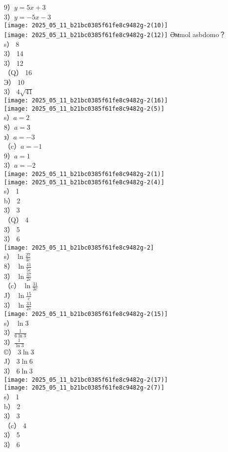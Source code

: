 \documentclass[10pt]{article}
\begin{document}
9）$y=5 x+3$\\
3）$y=-5 x-3$\\
\texttt{[image: 2025\_05\_11\_b21bc0385f61fe8c9482g-2(10)]}\\
\texttt{[image: 2025\_05\_11\_b21bc0385f61fe8c9482g-2(12)]} Әмmol asbdomo？\\
s） 8\\
3） 14\\
3） 12\\
（Q） 16\\
Э） 10\\
3） $4 \sqrt{41}$\\
\texttt{[image: 2025\_05\_11\_b21bc0385f61fe8c9482g-2(16)]}\\
\texttt{[image: 2025\_05\_11\_b21bc0385f61fe8c9482g-2(5)]}\\
s）$a=2$\\
8）$a=3$\\
з）$a=-3$\\
（c）$a=-1$\\
9）$a=1$\\
3）$a=-2$\\
\texttt{[image: 2025\_05\_11\_b21bc0385f61fe8c9482g-2(1)]}\\
\texttt{[image: 2025\_05\_11\_b21bc0385f61fe8c9482g-2(4)]}\\
s） 1\\
b） 2\\
3） 3\\
（Q） 4\\
3） 5\\
3） 6\\
\texttt{[image: 2025\_05\_11\_b21bc0385f61fe8c9482g-2]}\\
s） $\ln \frac{27}{4 e}$\\
8） $\ln \frac{41}{5 e}$\\
3） $\ln \frac{37}{2 e}$\\
（c） $\ln \frac{31}{3 e}$\\
J） $\ln \frac{15}{e}$\\
3） $\ln \frac{33}{2 e}$\\
\texttt{[image: 2025\_05\_11\_b21bc0385f61fe8c9482g-2(15)]}\\
s） $\ln 3$\\
3）$\frac{1}{6 \ln 3}$\\
3）$\frac{1}{\ln 3}$\\
©） $3 \ln 3$\\
J） $3 \ln 6$\\
3） $6 \ln 3$\\
\texttt{[image: 2025\_05\_11\_b21bc0385f61fe8c9482g-2(17)]}\\
\texttt{[image: 2025\_05\_11\_b21bc0385f61fe8c9482g-2(7)]}\\
s） 1\\
b） 2\\
3） 3\\
（c） 4\\
3） 5\\
3） 6
\end{document}
